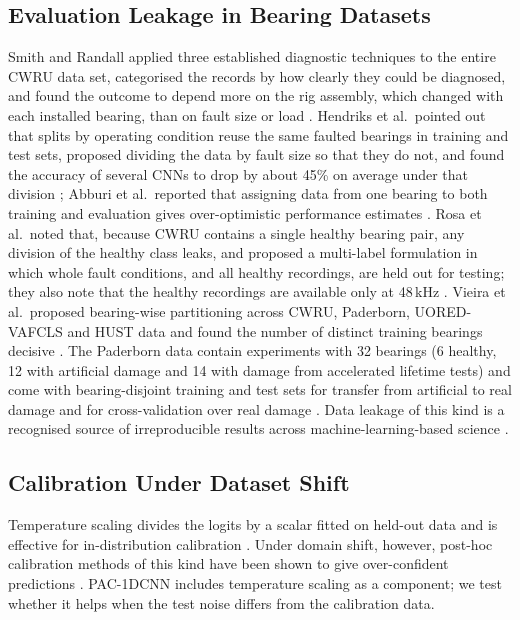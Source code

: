 \documentclass[conference]{IEEEtran}
\begin{document}
\subsection{Evaluation Leakage in Bearing Datasets}
Smith and Randall applied three established diagnostic techniques to the entire CWRU data set, categorised the records by how clearly they could be diagnosed, and found the outcome to depend more on the rig assembly, which changed with each installed bearing, than on fault size or load \cite{smith2015cwru}. Hendriks et al.\ pointed out that splits by operating condition reuse the same faulted bearings in training and test sets, proposed dividing the data by fault size so that they do not, and found the accuracy of several CNNs to drop by about 45\% on average under that division \cite{hendriks2022cwru}; Abburi et al.\ reported that assigning data from one bearing to both training and evaluation gives over-optimistic performance estimates \cite{abburi2023closer}. Rosa et al.\ noted that, because CWRU contains a single healthy bearing pair, any division of the healthy class leaks, and proposed a multi-label formulation in which whole fault conditions, and all healthy recordings, are held out for testing; they also note that the healthy recordings are available only at 48\,kHz \cite{rosa2024multilabel}. Vieira et al.\ proposed bearing-wise partitioning across CWRU, Paderborn, UORED-VAFCLS and HUST data and found the number of distinct training bearings decisive \cite{vieira2026realistic}. The Paderborn data contain experiments with 32 bearings (6 healthy, 12 with artificial damage and 14 with damage from accelerated lifetime tests) and come with bearing-disjoint training and test sets for transfer from artificial to real damage and for cross-validation over real damage \cite{lessmeier2016kat}. Data leakage of this kind is a recognised source of irreproducible results across machine-learning-based science \cite{kapoor2023leakage}.

\subsection{Calibration Under Dataset Shift}
Temperature scaling divides the logits by a scalar fitted on held-out data and is effective for in-distribution calibration \cite{guo2017calibration}. Under domain shift, however, post-hoc calibration methods of this kind have been shown to give over-confident predictions \cite{tomani2021drift}. PAC-1DCNN includes temperature scaling as a component; we test whether it helps when the test noise differs from the calibration data.
\end{document}

